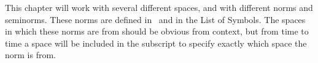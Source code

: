 This chapter will work with several different spaces, and with different norms and 
seminorms. 
These norms are defined in~\cite{Braess} and in the List of Symbols. 
The spaces in which these norms are from should be obvious from context, but from 
time to time a space will be included in the subscript to specify exactly which 
space the norm is from.